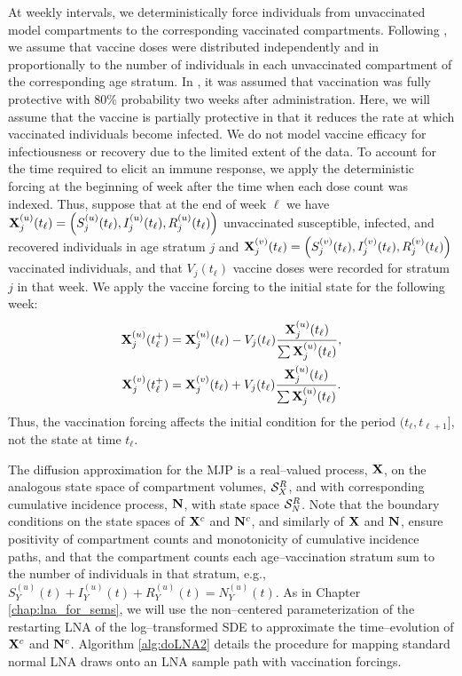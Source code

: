 At weekly intervals, we deterministically force individuals from unvaccinated model compartments to the corresponding vaccinated compartments. Following \cite{shubin2016revealing}, we assume that vaccine doses were distributed independently and in proportionally to the number of individuals in each unvaccinated compartment of the corresponding age stratum. In \cite{shubin2016revealing}, it was assumed that vaccination was fully protective with 80\% probability two weeks after administration. Here, we will assume that the vaccine is partially protective in that it reduces the rate at which vaccinated individuals become infected. We do not model vaccine efficacy for infectiousness or recovery due to the limited extent of the data. To account for the time required to elicit an immune response, we apply the deterministic forcing at the beginning of week after the time when each dose count was indexed. Thus, suppose that at the end of week $ \ell $ we have $ \mathbf{X}_j^{(u)}(t_\ell) = \left (S_j^{(u)}(t_\ell), I_j^{(u)}(t_\ell), R_j^{(u)}(t_\ell)\right ) $ unvaccinated susceptible, infected, and recovered individuals in age stratum $ j $ and $ \mathbf{X}_j^{(v)}(t_\ell) = \left (S_j^{(v)}(t_\ell), I_j^{(v)}(t_\ell), R_j^{(v)}(t_\ell)\right ) $ vaccinated individuals, and that $ V_j(t_\ell) $ vaccine doses were recorded for stratum $ j $ in that week. We apply the vaccine forcing to the initial state for the following week: 
\begin{align}
\label{eqn:vacc_forcing}
\begin{split}
	\mathbf{X}_{j}^{(u)}(t_\ell^+) &= \mathbf{X}_j^{(u)}(t_\ell) - V_j(t_\ell)\frac{\mathbf{X}_{j}^{(u)}(t_\ell)}{\sum\mathbf{X}_{j}^{(u)}(t_\ell)}, \\
	\mathbf{X}_{j}^{(v)}(t_\ell^+) &= \mathbf{X}_j^{(v)}(t_\ell) + V_j(t_\ell)\frac{\mathbf{X}_{j}^{(u)}(t_\ell)}{\sum\mathbf{X}_{j}^{(u)}(t_\ell)}.
\end{split}
\end{align}
Thus, the vaccination forcing affects the initial condition for the period $ (t_\ell,t_{\ell+1}] $, not the state at time $ t_\ell $. 

The diffusion approximation for the MJP is a real--valued process, $ \mathbf{X} $, on the analogous state space of compartment volumes, $ \mathcal{S}_X^R $, and with corresponding cumulative incidence process, $ \mathbf{N} $, with state space $ \mathcal{S}_N^R $. Note that the boundary conditions on the state spaces of $ \mathbf{X}^c $ and $ \mathbf{N}^c $, and similarly of $ \mathbf{X} $ and $ \mathbf{N} $, ensure positivity of compartment counts and monotonicity of cumulative incidence paths, and that the compartment counts each age--vaccination stratum sum to the number of individuals in that stratum, e.g., $ S_{Y}^{(u)}(t) + I_{Y}^{(u)}(t) + R_{Y}^{(u)}(t) = N_{Y}^{(u)}(t) $. As in Chapter \ref{chap:lna_for_sems}, we will use the non--centered parameterization of the restarting LNA of the log--transformed SDE to approximate the time--evolution of $ \mathbf{X}^c $ and $ \mathbf{N}^c $. Algorithm \ref{alg:doLNA2} details the procedure for mapping standard normal LNA draws onto an LNA sample path with vaccination forcings.

